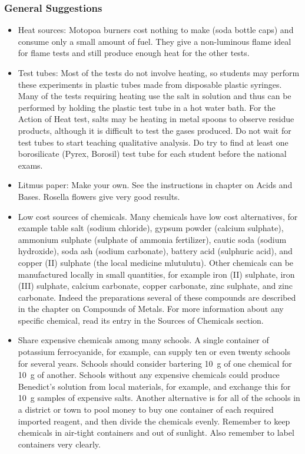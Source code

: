 \subsubsection{General Suggestions}
\begin{itemize}
\item{Heat sources: Motopoa burners cost nothing to make (soda bottle caps) and consume only a small amount of fuel. They give a non-luminous flame ideal for flame tests and still produce enough heat for the other tests.}
\item{Test tubes: Most of the tests do not involve heating, so students may perform these experiments in plastic tubes made from disposable plastic syringes. Many of the tests requiring heating use the salt in solution and thus can be performed by holding the plastic test tube in a hot water bath. For the Action of Heat test, salts may be heating in metal spoons to observe residue products, although it is difficult to test the gases produced. Do not wait for test tubes to start teaching qualitative analysis. Do try to find at least one borosilicate (Pyrex, 
Borosil) test tube for each student before the national exams.}
\item{Litmus paper: Make your own. See the instructions in chapter on Acids and Bases. Rosella flowers give very good results.}
\item{Low cost sources of chemicals. Many chemicals have low cost alternatives, for example table salt (sodium chloride), gypsum powder (calcium sulphate), ammonium sulphate (sulphate of ammonia fertilizer), cautic soda (sodium hydroxide), soda ash (sodium carbonate), battery acid (sulphuric acid), and copper (II) sulphate (the local medicine mlutulutu). Other chemicals can be manufactured locally in small quantities, for example iron (II) sulphate, iron (III) sulphate, calcium carbonate, copper carbonate, zinc sulphate, and zinc carbonate. Indeed the preparations several of these compounds are described in the chapter on Compounds of Metals. For more information about any specific chemical, read its entry in the Sources of Chemicals section.}
\item{Share expensive chemicals among many schools. A single container of potassium ferrocyanide, for example, can supply ten or even twenty schools for several years. Schools should consider bartering 10~g of one chemical for 10~g of another. Schools without any expensive chemicals could produce Benedict's solution from local materials, for example, and exchange this for 10~g samples of expensive salts. Another alternative is for all of the schools in a district or town to pool money to buy one container of each required imported reagent, and then divide the chemicals evenly. Remember to keep chemicals in air-tight containers and out of sunlight. Also remember to label containers very clearly.}
\end{itemize} 

